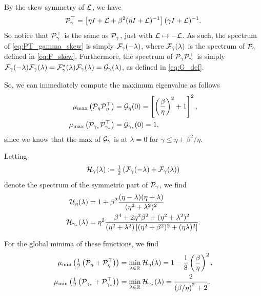 \documentclass[a4paper,10pt]{article}
\begin{document}
{By the skew symmetry of ${\cal L}$, we have
\begin{align}
\label{eq:PT_gamma_skew}
{\cal P}_{\gamma}^\top = \left[ \eta I + {\cal L} +  \beta^2 (\eta I + {\cal L})^{-1} \right] (\gamma I + {\cal L})^{-1}.
\end{align}
So notice that ${\cal P}_{\gamma}^\top$ is the same as ${\cal P}_{\gamma}$, just with ${\cal L} \mapsto - {\cal L}$. As such, the spectrum of \eqref{eq:PT_gamma_skew} is simply ${\cal F}_{\gamma}(- \lambda)$, where ${\cal F}_{\gamma}(\lambda)$ is the spectrum of ${\cal P}_{\gamma}$ defined in \eqref{eq:F_skew}. Furthermore, the spectrum of ${\cal P}_{\gamma} {\cal P}_{\gamma}^\top $ is simply ${\cal F}_{\gamma}(- \lambda) {\cal F}_{\gamma}(\lambda) = {\cal F}_{\gamma}^*(\lambda) {\cal F}_{\gamma}(\lambda) = {\cal G}_{\gamma}(\lambda)$, as defined in \eqref{eq:G_def}.

So, we can immediately compute the maximum eigenvalue as follows
\begin{equation}
\begin{aligned}
\label{eq:mu_skew}
\mu_{\max} \left( {\cal P}_{\eta} {\cal P}_{\eta}^\top \right) 
&= {\cal G}_{\eta}(0)
= 
\left[ \left(\frac{\beta}{\eta}\right)^2 +1 \right]^2, 
\\
\mu_{\max} \left( {\cal P}_{\gamma_*} {\cal P}_{\gamma_*}^\top \right) 
&= {\cal G}_{\gamma_*}(0) 
= 
1,
\end{aligned}
\end{equation}
since we know that the max of ${\cal G}_{\gamma}$ is at $\lambda = 0$ for $\gamma \leq \eta + \beta^2 / \eta$. 

Letting
\begin{align*}
{\cal H}_{\gamma}(\lambda) \coloneqq \tfrac{1}{2} \left( {\cal F}_{\gamma}(- \lambda) + {\cal F}_{\gamma}(\lambda) \right)
\end{align*}
denote the spectrum of the symmetric part of ${\cal P}_{\gamma}$, we find
\begin{align*}
{\cal H}_{\eta}(\lambda) 
&= 
1 + \beta^2 \frac{(\eta - \lambda)(\eta + \lambda)}{(\eta^2 + \lambda^2)^2}
\\
{\cal H}_{\gamma_*}(\lambda) 
&= 
\eta^2 \frac{\beta^4 + 2 \eta^2 \beta^2 +  (\eta^2 + \lambda^2)^2}{(\eta^2 + \lambda^2) \left[ (\eta^2 + \beta^2)^2 + (\eta \lambda)^2 \right]}.
\end{align*}

For the global minima of these functions, we find
\begin{equation}
\begin{aligned}
\label{eq:H_min_skew}
\mu_{\min} \left( \tfrac{1}{2}  \left( {\cal P}_{\eta} +  {\cal P}_{\eta}^\top \right) \right) 
&= 
\underset{\lambda \in \mathbb{R}}{\min} \,  {\cal H}_{\eta}(\lambda) = 1 - \frac{1}{8} \left( \frac{\beta}{\eta} \right)^2, \\
\mu_{\min} \left( \tfrac{1}{2} \left( {\cal P}_{\gamma_*} +  {\cal P}_{\gamma_*}^\top \right) \right)
&=
\underset{\lambda \in \mathbb{R}}{\min} \,  {\cal H}_{\gamma_*}(\lambda) =  \frac{2}{\left( \beta/\eta \right)^2 + 2}. 
\end{aligned}
\end{equation}

}
\end{document}
